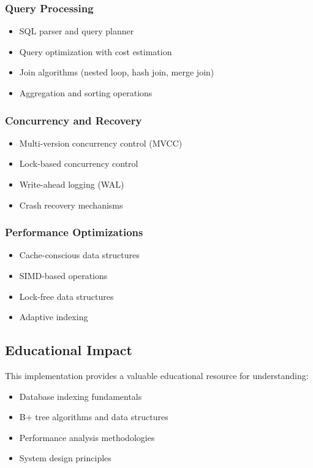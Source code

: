 \documentclass[conference]{IEEEtran}
\begin{document}
\subsubsection{Query Processing}
\begin{itemize}
    \item SQL parser and query planner
    \item Query optimization with cost estimation
    \item Join algorithms (nested loop, hash join, merge join)
    \item Aggregation and sorting operations
\end{itemize}

\subsubsection{Concurrency and Recovery}
\begin{itemize}
    \item Multi-version concurrency control (MVCC)
    \item Lock-based concurrency control
    \item Write-ahead logging (WAL)
    \item Crash recovery mechanisms
\end{itemize}

\subsubsection{Performance Optimizations}
\begin{itemize}
    \item Cache-conscious data structures
    \item SIMD-based operations
    \item Lock-free data structures
    \item Adaptive indexing
\end{itemize}

\subsection{Educational Impact}

This implementation provides a valuable educational resource for understanding:

\begin{itemize}
    \item Database indexing fundamentals
    \item B+ tree algorithms and data structures
    \item Performance analysis methodologies
    \item System design principles
\end{itemize}
\end{document}
